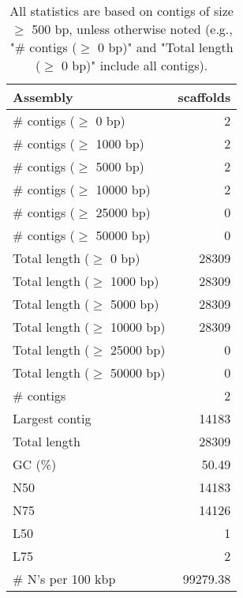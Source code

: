 \documentclass[12pt,a4paper]{article}
\begin{document}
\begin{table}[ht]
\begin{center}
\caption{All statistics are based on contigs of size $\geq$ 500 bp, unless otherwise noted (e.g., "\# contigs ($\geq$ 0 bp)" and "Total length ($\geq$ 0 bp)" include all contigs).}
\begin{tabular}{|l*{1}{|r}|}
\hline
Assembly & scaffolds \\ \hline
\# contigs ($\geq$ 0 bp) & 2 \\ \hline
\# contigs ($\geq$ 1000 bp) & 2 \\ \hline
\# contigs ($\geq$ 5000 bp) & 2 \\ \hline
\# contigs ($\geq$ 10000 bp) & 2 \\ \hline
\# contigs ($\geq$ 25000 bp) & 0 \\ \hline
\# contigs ($\geq$ 50000 bp) & 0 \\ \hline
Total length ($\geq$ 0 bp) & 28309 \\ \hline
Total length ($\geq$ 1000 bp) & 28309 \\ \hline
Total length ($\geq$ 5000 bp) & 28309 \\ \hline
Total length ($\geq$ 10000 bp) & 28309 \\ \hline
Total length ($\geq$ 25000 bp) & 0 \\ \hline
Total length ($\geq$ 50000 bp) & 0 \\ \hline
\# contigs & 2 \\ \hline
Largest contig & 14183 \\ \hline
Total length & 28309 \\ \hline
GC (\%) & 50.49 \\ \hline
N50 & 14183 \\ \hline
N75 & 14126 \\ \hline
L50 & 1 \\ \hline
L75 & 2 \\ \hline
\# N's per 100 kbp & 99279.38 \\ \hline
\end{tabular}
\end{center}
\end{table}
\end{document}
